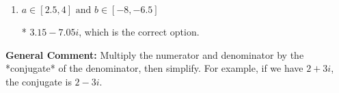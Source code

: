 \documentclass{extbook}[14pt]
\begin{document}
\begin{enumerate}
{\begin{enumerate}[label=\Alph*.]
 $126.00  - 7.05 i$, which corresponds to forgetting to multiply the conjugate by the numerator and using a plus instead of a minus in the denominator.
\item \( a \in [2.5, 4] \text{ and } b \in [-8, -6.5] \)

* $3.15  - 7.05 i$, which is the correct option.
\end{enumerate}

\textbf{General Comment:} Multiply the numerator and denominator by the *conjugate* of the denominator, then simplify. For example, if we have $2+3i$, the conjugate is $2-3i$.
}
\end{enumerate}
\end{document}
